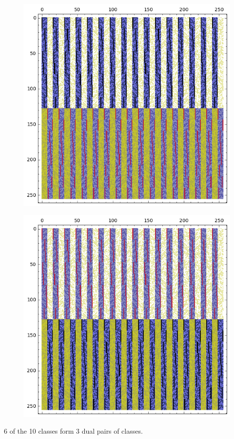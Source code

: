\documentclass[12pt,a4paper]{article}
\begin{document}
\begin{figure}[!hb]
\centering
\begin{minipage}{.48\textwidth}
  \centering
  \includegraphics[width=.9\linewidth]{../matrix_plot/re8_10_bent_cayley_graph_index_matrix.png}
  \label{fig:c8_10_bent_cayley_graph_index_matrix}
\end{minipage}
\begin{minipage}{.48\textwidth}
  \centering
  \includegraphics[width=.9\linewidth]{../matrix_plot/re8_10_dual_cayley_graph_index_matrix.png}
  \label{fig:c8_10_dual_cayley_graph_index_matrix}
\end{minipage}%
\end{figure}
6 of the 10 classes form 3 dual pairs of classes.
\end{document}
